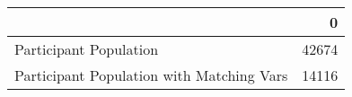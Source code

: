 \begin{tabular}{lr}
\toprule
{} &      0 \\
\midrule
Participant Population                    &  42674 \\
Participant Population with Matching Vars &  14116 \\
\bottomrule
\end{tabular}
